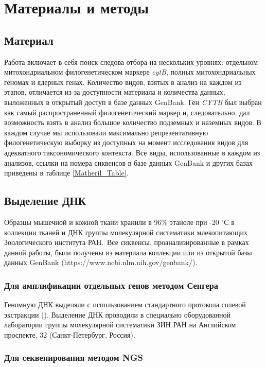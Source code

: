 \chapter{Материалы и методы} \label{mm}

\section{Материал}

Работа включает в себя поиск следова отбора на нескольких уровнях: отдельном митохондриальном филогенетическом маркере \textit{cytB}, полных митохондриальных геномах и ядерных генах. Количество видов, взятых в анализ на каждом из этапов, отличается из-за доступности материала и количества данных, выложенных в открытый доступ в базе данных GenBank. Ген \textit{CYTB} был выбран как самый распространенный филогенетический маркер и, следовательно, дал возможность взять в анализ большое количество подземных и наземных видов.
В каждом случае мы использовали максимально репрезентативную филогенетическую выборку из доступных на момент исследования видов для адекватного таксономического контекста. Все виды, использованные в каждом из анализов, ссылки на номера сиквенсов в базе данных GenBank и других базах приведены в таблице \ref{Matheril_Table}. 

\section{Выделение ДНК}

Образцы мышечной и кожной ткани хранили в 96\% этаноле при -20 $^\circ$С в коллекции тканей и ДНК группы молекулярной систематики млекопитающих Зоологического института РАН. Все сиквенсы, проанализированные в рамках данной работы, были получены из материала коллекции или из открытой базы данных GenBank (https://www.ncbi.nlm.nih.gov/genbank/).

\subsection{Для амплификации отдельных генов методом Сенгера}

Геномную ДНК выделяли с использованием стандартного протокола солевой экстракции (\cite{Miller1999}). Выделение ДНК проводили в специально оборудованной лаборатории группы молекулярной систематики ЗИН РАН на Английском проспекте, 32 (Санкт-Петербург, Россия).

\subsection{Для секвенирования методом NGS}

